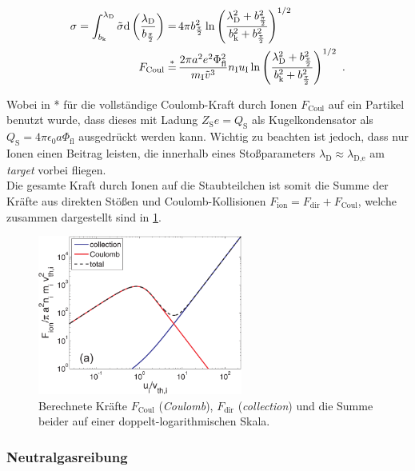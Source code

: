 \documentclass[numbers=noenddot,a4paper]{scrartcl}
\newcommand{\diff}{\textnormal{d}}
\newcommand{\ix}[1]{_\text{#1}}
\newcommand{\tilt}[1]{\textit{#1}}
\begin{document}
					\begin{align}
						\sigma=\int_{b\ix{k}}^{\lambda\ix{D}}\tilde{\sigma}\diff\left(\frac{\lambda\ix{D}}{b_{\frac{\pi}{2}}}\right)=&\,4\pi b_{\frac{\pi}{2}}^2\ln\left(\frac{\lambda\ix{D}^2+b_{\frac{\pi}{2}}^2}{b\ix{k}^2+b_{\frac{\pi}{2}}^2}\right)^{1/2} \nonumber \\
						F\ix{Coul}\overset{*}{=}&\,\frac{2\pi a^2 e^2\Phi\ix{fl}^2}{m\ix{I}\tilde{v}^3}n\ix{I}u\ix{I}\ln\left(\frac{\lambda\ix{D}^2+b_{\frac{\pi}{2}}^2}{b\ix{k}^2+b_{\frac{\pi}{2}}^2}\right)^{1/2} \, \, .
					\end{align}
					
				Wobei in * für die vollständige Coulomb-Kraft durch Ionen $F\ix{Coul}$ auf ein Partikel benutzt wurde, dass dieses mit Ladung $Z\ix{S}e=Q\ix{S}$ als Kugelkondensator als $Q\ix{S}=4\pi\epsilon\ix{0}a\Phi\ix{fl}$ ausgedrückt werden kann. Wichtig zu beachten ist jedoch, dass nur Ionen einen Beitrag leisten, die innerhalb eines Stoßparameters $\lambda\ix{D}\approx\lambda\ix{D,e}$ am \tilt{target} vorbei fliegen.\\
				Die gesamte Kraft durch Ionen auf die Staubteilchen ist somit die Summe der Kräfte aus direkten Stößen und Coulomb-Kollisionen $F\ix{ion}=F\ix{dir}+F\ix{Coul}$, welche zusammen dargestellt sind in \ref{img:ionkräfte}.
				
					\begin{figure}
						\centering
						\includegraphics[height=0.4\textwidth,width=0.6\textwidth]{figs/forcesandtrappingmelzer.png}
						\caption{Berechnete Kräfte $F\ix{Coul}$ (\tilt{Coulomb}), $F\ix{dir}$ (\tilt{collection}) und die Summe beider auf einer doppelt-logarithmischen Skala.}\label{img:ionkräfte}
					\end{figure}
					
			\subsubsection{Neutralgasreibung}
			
\end{document}
